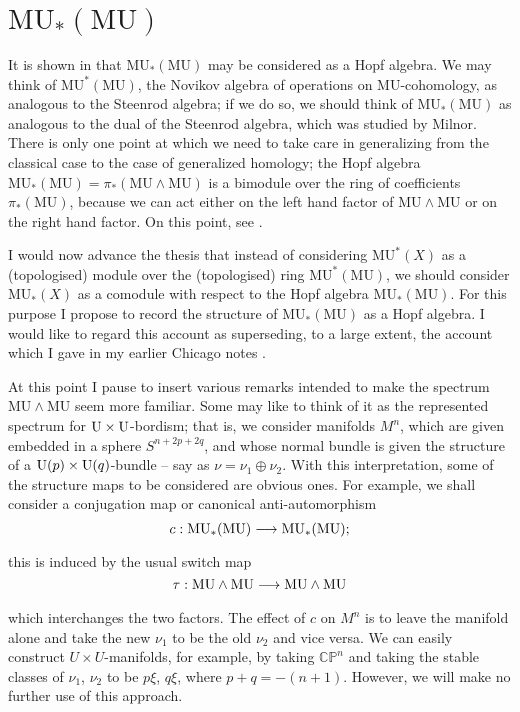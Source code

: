 \documentclass[../main]{subfiles}
\begin{document}
\label{sec:p2c11}
\chapter{$\mathrm{MU}_\ast(\mathrm{MU})$}
It is shown in \cite[Lecture 3, pp.~56-76]{adams3} that $\mathrm{MU}_\ast(\mathrm{MU})$ may be considered as a Hopf algebra. We may think of $\mathrm{MU}^\ast(\mathrm {MU})$, the Novikov algebra of operations on MU-cohomology, as analogous to the Steenrod algebra; if we do so, we should think of $\mathrm{MU}_\ast(\mathrm {MU})$ as analogous to the dual of the Steenrod algebra, which was studied by Milnor. \cite{milnor} There is only one point at which we need to take care in generalizing from the classical case to the case of generalized homology; the Hopf algebra $\mathrm{MU}_\ast(\mathrm {MU}) = \pi_\ast(\mathrm{MU} \wedge \mathrm{MU})$ is a bimodule over the ring of coefficients $\pi_\ast(\mathrm{MU})$, because we can act either on the left hand factor of $\mathrm{MU} \wedge \mathrm{MU}$ or on the right hand factor. On this point, see \cite[Lecture 3, pp.~59-60]{adams3}.

I would now advance the thesis that instead of considering $\mathrm{MU}^\ast(X)$ as a (topologised) module over the (topologised) ring $\mathrm {MU}^\ast(\mathrm{MU})$, we should consider $\mathrm{MU}_\ast(X)$ as a comodule with respect to the Hopf algebra $\mathrm{MU}_\ast(\mathrm{MU})$. For this purpose I propose to record the structure of $\mathrm{MU}_\ast(\mathrm{MU})$ as a Hopf algebra. I would like to regard this account as superseding, to a large extent, the account which I gave in my earlier Chicago notes \cite{adams2}.

At this point I pause to insert various remarks intended to make the spectrum $\mathrm{MU} \wedge \mathrm{MU}$ seem more familiar. Some may like to think of it as the represented spectrum for $\mathrm{U} \times \mathrm{U}$-bordism; that is, we consider manifolds $M^n$, which are given embedded in a sphere $S^{n + 2p + 2q}$, and whose normal bundle is given the structure of a $\mathrm{U}(p) \times \mathrm{U}(q)$-bundle -- say as $\nu = \nu_1 \oplus \nu_2$. With this interpretation, some of the structure maps to be considered are obvious ones. For example, we shall consider a conjugation map or canonical anti-automorphism
\[c: \mathrm{MU}_\ast(\mathrm{MU}) \lar{} \mathrm{MU}_\ast(\mathrm{MU});\]
this is induced by the usual switch map
\[\tau : \mathrm{MU} \wedge \mathrm{MU} \lar{} \mathrm{MU} \wedge \mathrm{MU}\]
which interchanges the two factors. The effect of $c$ on $M^n$ is to leave the manifold alone and take the new $\nu_1$ to be the old $\nu_2$ and vice versa. We can easily construct $U \times U$-manifolds, for example, by taking $\mathbb {CP}^n$ and taking the stable classes of $\nu_1$, $\nu_2$ to be $p \xi$, $q \xi$, where $p + q = -(n + 1)$. However, we will make no further use of this approach. 
\end{document}
